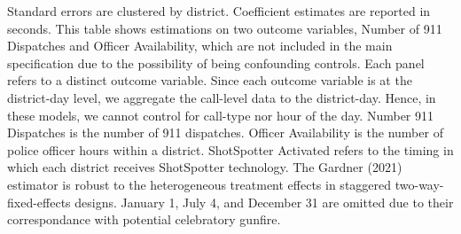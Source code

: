\begin{table}[H]
\begin{threeparttable}
\begin{tablenotes}
\item Standard errors are clustered by district. Coefficient                      estimates are reported in seconds.                      This table shows estimations on two outcome variables,                       Number of 911 Dispatches and Officer Availability, which are not                      included in the main specification due to the possibility of being                      confounding controls.                      Each panel refers to a distinct outcome variable. Since each outcome variable                      is at the district-day level, we aggregate the call-level data to the district-day.                      Hence, in these models, we cannot control for call-type nor hour of the day.                  Number 911 Dispatches is the number of 911 dispatches.                  Officer Availability is the number of police officer hours within a district.                  ShotSpotter Activated refers to the                  timing in which each district receives ShotSpotter technology. The                  Gardner (2021) estimator is robust to the heterogeneous                  treatment effects in staggered two-way-fixed-effects designs. January 1, July 4, and December 31 are omitted due                  to their correspondance with potential celebratory gunfire.
\end{tablenotes}
\end{threeparttable}
\end{table}
